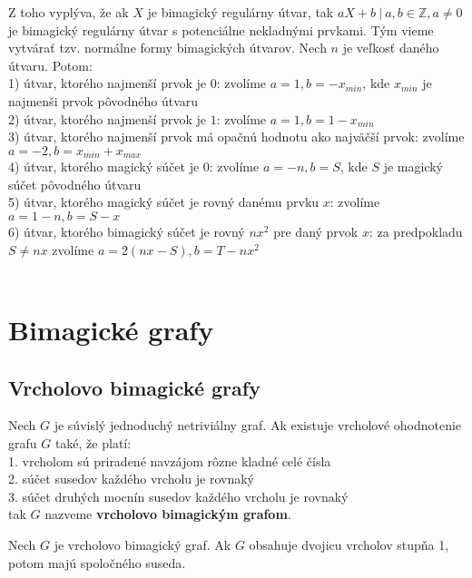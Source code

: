 Z toho vyplýva, že ak $X$ je bimagický regulárny útvar, tak $aX+b ~|~ a,b \in \mathbb{Z}, a \neq 0$ je bimagický regulárny útvar s potenciálne nekladnými prvkami. Tým vieme vytvárať tzv. normálne formy bimagických útvarov. Nech $n$ je veľkosť daného útvaru. Potom: \\
1) útvar, ktorého najmenší prvok je $0$: zvolíme $a = 1, b = - x_{min}$, kde $x_{min}$ je najmenši prvok pôvodného útvaru \\
2) útvar, ktorého najmenší prvok je $1$: zvolíme $a = 1, b = 1 - x_{min}$ \\
3) útvar, ktorého najmenší prvok má opačnú hodnotu ako najväčší prvok: zvolíme $a = -2, b = x_{min} + x_{max}$ \\
4) útvar, ktorého magický súčet je $0$: zvolíme $a = -n, b = S$, kde $S$ je magický súčet pôvodného útvaru \\
5) útvar, ktorého magický súčet je rovný danému prvku $x$: zvolíme $a = 1-n, b = S-x$ \\
6) útvar, ktorého bimagický súčet je rovný $nx^2$ pre daný prvok $x$: za predpokladu $S \neq nx$ zvolíme $a = 2(nx - S), b = T - nx^2$ \\\\




\section{Bimagické grafy}

\subsection{Vrcholovo bimagické grafy}

\begin{subdefinition} Nech $G$ je súvislý jednoduchý netriviálny graf. Ak existuje vrcholové ohodnotenie grafu $G$ také, že platí: \\
1. vrcholom sú priradené navzájom rôzne kladné celé čísla \\
2. súčet susedov každého vrcholu je rovnaký \\
3. súčet druhých mocnín susedov každého vrcholu je rovnaký \\
tak $G$ nazveme \textbf{vrcholovo bimagickým grafom}.
\end{subdefinition}

\begin{subtheorem} Nech $G$ je vrcholovo bimagický graf. Ak $G$ obsahuje dvojicu vrcholov stupňa 1, potom majú spoločného suseda.
\end{subtheorem}

